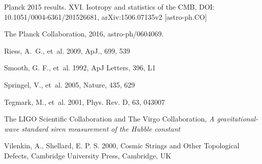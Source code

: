 \documentclass{rmaa}
\begin{document}
\begin{thebibliography}
 Planck 2015 results. XVI. Isotropy and statistics of the CMB, DOI:  	10.1051/0004-6361/201526681,  arXiv:1506.07135v2 [astro-ph.CO]
 
The Planck Collaboration, 2016, astro-ph/0604069. 
 
 Riess, A.~G., et~al. 2009, ApJ., 699, 539 

Smooth, G. F., et~al. 1992, ApJ Letters, 396, L1 
  
 Springel, V., et~al.  2005, Nature, 435, 629  

Tegmark, M., et~al. 2001, Phys. Rev. D, 63, 043007   

The LIGO Scientific Collaboration and The Virgo Collaboration, \textit{A gravitational-wave standard siren measurement of the Hubble constant}
 
 Vilenkin, A., Shellard, E. P. S. 2000, Cosmic Strings and Other Topological Defects,
Cambridge University Press,  Cambridge, UK 




\end{thebibliography}
\end{document}

